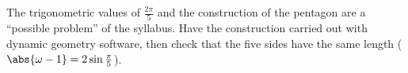 \begin{teachernote}
The trigonometric values of $\frac{2\pi}5$ and the construction of the pentagon are a ``possible problem'' of the syllabus. Have the construction carried out with dynamic geometry software, then check that the five sides have the same length ($\abs{\omega-1}=2\sin\frac\pi5$).
\end{teachernote}
